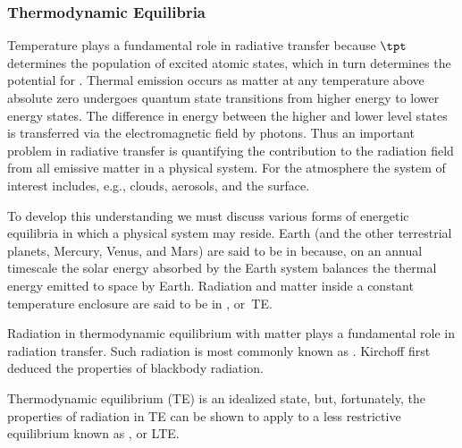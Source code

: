 \documentclass[12pt]{article}
\begin{document}
\subsubsection[Thermodynamic Equilibria]{Thermodynamic Equilibria}\label{sxn:tdy_eqm}
Temperature plays a fundamental role in radiative transfer because 
$\tpt$ determines the population of excited atomic states, which
in turn determines the potential for .
Thermal emission occurs as matter at any temperature above absolute
zero undergoes quantum state transitions from higher energy to lower
energy states. 
The difference in energy between the higher and lower level states
is transferred via the electromagnetic field by photons. 
Thus an important problem in radiative transfer is quantifying
the contribution to the radiation field from all emissive matter
in a physical system.
For the atmosphere the system of interest includes, e.g., clouds,
aerosols, and the surface.

To develop this understanding we must discuss various forms of
energetic equilibria in which a physical system may reside.
Earth (and the other terrestrial planets, Mercury, Venus, and Mars)
are said to be in 
because, on an annual timescale the solar energy absorbed by the
Earth system balances the thermal energy emitted to space by Earth. 
Radiation and matter inside a constant temperature enclosure are
said to be in , or~TE\@.

Radiation in thermodynamic equilibrium with matter plays a fundamental 
role in radiation transfer. 
Such radiation is most commonly known as .  
Kirchoff first deduced the properties of blackbody radiation.

Thermodynamic equilibrium (TE) is an idealized state, but,
fortunately, the properties of radiation in TE can be shown to apply
to a less restrictive equilibrium known as , or LTE\@.  
\end{document}
